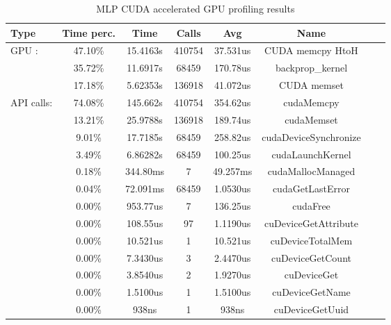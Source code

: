 \documentclass[11pt]{article}
\begin{document}
\begin{table}[h]	\centering
	\begin{tabular}{|l|c|c|c|c|c|c|c|}
		\hline
		\textbf{Type} & \textbf{Time perc.} & \textbf{Time} & \textbf{Calls} & \textbf{Avg} & \textbf{Name}         \\ \hline
		GPU :         & 47.10\%             & 15.4163s      & 410754         & 37.531us     & CUDA memcpy HtoH      \\ \hline
		              & 35.72\%             & 11.6917s      & 68459          & 170.78us     & backprop\_kernel      \\ \hline
		              & 17.18\%             & 5.62353s      & 136918         & 41.072us     & CUDA memset           \\ \hline
		API calls:    & 74.08\%             & 145.662s      & 410754         & 354.62us     & cudaMemcpy            \\ \hline
		              & 13.21\%             & 25.9788s      & 136918         & 189.74us     & cudaMemset            \\ \hline
		              & 9.01\%              & 17.7185s      & 68459          & 258.82us     & cudaDeviceSynchronize \\ \hline
		              & 3.49\%              & 6.86282s      & 68459          & 100.25us     & cudaLaunchKernel      \\ \hline
		              & 0.18\%              & 344.80ms      & 7              & 49.257ms     & cudaMallocManaged     \\ \hline
		              & 0.04\%              & 72.091ms      & 68459          & 1.0530us     & cudaGetLastError      \\ \hline
		              & 0.00\%              & 953.77us      & 7              & 136.25us     & cudaFree              \\ \hline
		              & 0.00\%              & 108.55us      & 97             & 1.1190us     & cuDeviceGetAttribute  \\ \hline
		              & 0.00\%              & 10.521us      & 1              & 10.521us     & cuDeviceTotalMem      \\ \hline
		              & 0.00\%              & 7.3430us      & 3              & 2.4470us     & cuDeviceGetCount      \\ \hline
		              & 0.00\%              & 3.8540us      & 2              & 1.9270us     & cuDeviceGet           \\ \hline
		              & 0.00\%              & 1.5100us      & 1              & 1.5100us     & cuDeviceGetName       \\ \hline
		              & 0.00\%              & 938ns         & 1              & 938ns        & cuDeviceGetUuid       \\ \hline
	\end{tabular}
	\caption{MLP CUDA accelerated GPU profiling results}
	\label{tab:mlp_cuda_profiler}
\end{table}
\end{document}
